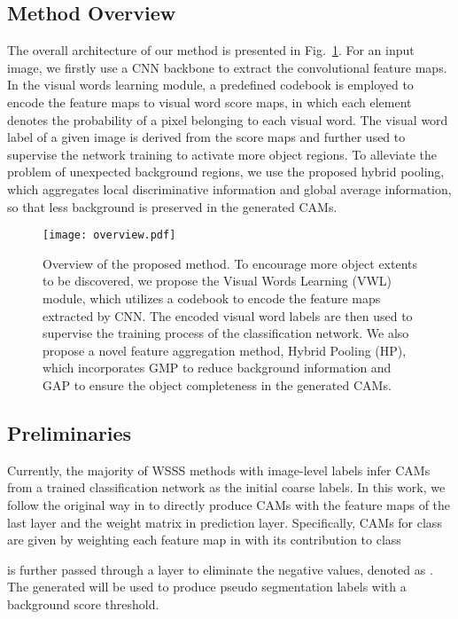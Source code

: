 \subsection{Method Overview}
\par The overall architecture of our method is presented in Fig.~\ref{fig_overview}. For an input image, we firstly use a CNN backbone to extract the convolutional feature maps. In the visual words learning module, a predefined codebook is employed to encode the feature maps to visual word score maps, in which each element denotes the probability of a pixel belonging to each visual word. The visual word label of a given image is derived from the score maps and further used to supervise the network training to activate more object regions. To alleviate the problem of unexpected background regions, we use the proposed hybrid pooling, which aggregates local discriminative information and global average information, so that less background is preserved in the generated CAMs.

\begin{figure}[!tbp]
  \centering
  \texttt{[image: overview.pdf]}
  \caption{Overview of the proposed method. To encourage more object extents to be discovered, we propose the Visual Words Learning (VWL) module, which utilizes a codebook to encode the feature maps extracted by CNN. The encoded visual word labels are then used to supervise the training process of the classification network. We also propose a novel feature aggregation method, \ie Hybrid Pooling (HP), which incorporates GMP to reduce background information and GAP to ensure the object completeness in the generated CAMs.}
  \label{fig_overview}
\end{figure}

\subsection{Preliminaries}
\par Currently, the majority of WSSS methods with image-level labels infer CAMs \citep{zhou2016learning} from a trained classification network as the initial coarse labels. In this work, we follow the original way in \citep{zhou2016learning} to directly produce CAMs with the feature maps of the last  layer and the weight matrix  in prediction layer. Specifically, CAMs for class  are given by weighting each feature map in  with its contribution to class 


 is further passed through a  layer to eliminate the negative values, denoted as . The generated  will be used to produce pseudo segmentation labels with a background score threshold.

